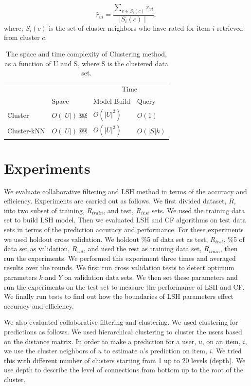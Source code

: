 \documentclass[conference]{IEEEtran}
\begin{document}
\begin{equation}
\hat{r}_{ui} = \frac{\sum\limits_{v \in S_i(c)} r_{vi}}{\mid S_i(c) \mid} ,
\label{eq:cluster-prediction}
\end{equation}
where; $S_i(c)$ is the set of cluster neighbors who have rated for item $i$ retrieved from cluster $c$.

\begin{table}
\centering
\begin{tabular}{llll}
\hline
& & \multicolumn {2}{c}{Time} \\
\cline{3-4}
     & Space & Model Build  & Query \\
\hline
Cluster & $O(|U|)$ ￼& $O(|U|^2)$ &$O(1)$ \\
Cluster-kNN & $O(|U|)$ ￼& $O(|U|^2)$ &$O(|S|k)$ \\
\hline
\end{tabular}
\caption{The space and time complexity of Clustering  method, as a function of U and S, where S is the clustered data set.}
\label{table:complexity-clustering}
\end{table}


\section{Experiments}
\label{sec:experiements}

We evaluate collaborative filtering and LSH method in terms of the accuracy 
and efficiency. Experiments are carried out as follows. We first divided 
dataset, $R$, into two subset of training, $R_{train}$, and test, $R_{test}$ 
sets. We used the training data set to build LSH model. Then we evaluated LSH 
and CF algorithms on test data sets in terms of the prediction accuracy and
performance. For these experiments we used holdout cross validation. We holdout
\%5 of data set as test, $R_{test}$, \%5 of data set as validation, $R_{val}$, 
and used the rest as training data set, $R_{train}$, then run the experiments. 
We performed this experiment three times and averaged results over the rounds. 
We first run cross validation tests to detect optimum parameters $k$ and $Y$ on 
validation data sets. We then set these parameters and run the experiments on 
the test set to measure the performance of LSH and CF. We finally run tests to 
find out how the boundaries of LSH parameters effect accuracy and efficiency. 

We also evaluated collaborative filtering and clustering. We used clustering for 
predictions as follows. We used hierarchical clustering to cluster the users 
based on the distance matrix. In order to make a prediction for a user, $u$, on
an item, $i$, we use the cluster neighbors of $u$ to estimate $u$'s prediction 
on item, $i$. We tried this with different number of clusters starting from 1 
up to 20 levels (depth). We use depth to describe the level of connections from
bottom up to the root of the cluster.
\end{document}
